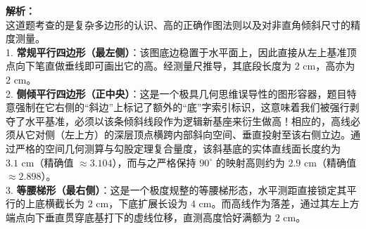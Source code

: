 \documentclass[12pt, a4paper]{ctexrep}
\begin{document}
\begin{center}
\end{center}

\vspace{0.8cm}

{\small\color{gray}
\textbf{解析：}\\
这道题考查的是复杂多边形的认识、高的正确作图法则以及对非直角倾斜尺寸的精度测量。\\
1. \textbf{常规平行四边形（最左侧）}：该图底边稳置于水平面上，因此直接从左上基准顶点向下笔直做垂线即可画出它的高。经测量尺推导，其底段长度为 $2\text{ cm}$，高亦为 $2\text{ cm}$。\\
2. \textbf{侧倾平行四边形（正中央）}：这是一个极具几何思维误导性的图形容器，题目特意强制在它右侧的“斜边”上标记了额外的“底”字索引标识，这意味着我们被强行剥夺了水平基准，必须以该条倾斜线段作为逻辑新基座来衍生做高！相应的，高线必须从它对侧（左上方）的深层顶点横跨内部斜向空间、垂直投射至该右侧立边。通过严格的空间几何测算与勾股定理复合量度，该斜基底的实体直线面长度约为 $3.1\text{ cm}$（精确值 $\approx 3.104$），而与之严格保持 $90^\circ$ 的映射高则约为 $2.9\text{ cm}$（精确值 $\approx 2.898$）。\\
3. \textbf{等腰梯形（最右侧）}：这是一个极度规整的等腰梯形态，水平测距直接锁定其平行的上底横截长为 $2\text{ cm}$，下底扩展长设为 $4\text{ cm}$。而高线作为落差，通过其左上方端点向下垂直贯穿底基打下的虚线位移，直测高度恰好满额为 $2\text{ cm}$。
}

\vspace{0.6cm}
\end{document}
